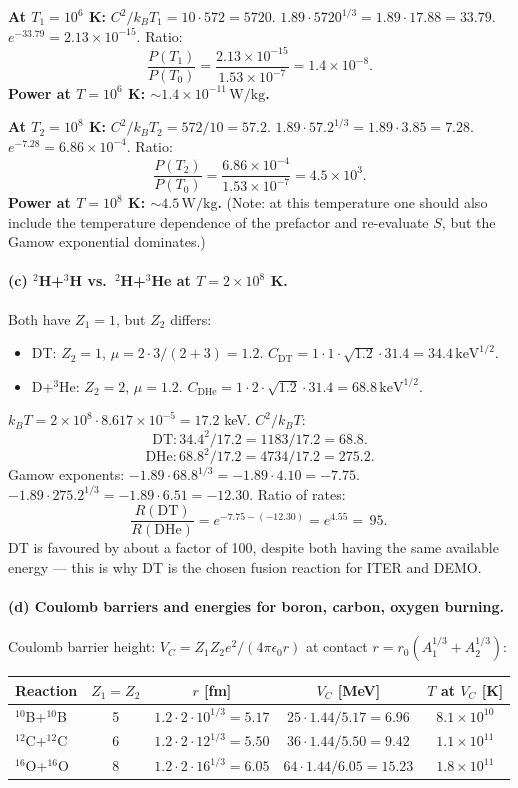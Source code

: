 \documentclass[11pt]{article}
\begin{document}
\textbf{At $T_1=10^{6}$ K:} $C^{2}/k_B T_1=10\cdot 572=5720$. $1.89\cdot 5720^{1/3}=1.89\cdot 17.88=33.79$. $e^{-33.79}=2.13\times 10^{-15}$. Ratio:
\[
\frac{P(T_1)}{P(T_0)}=\frac{2.13\times 10^{-15}}{1.53\times 10^{-7}}=1.4\times 10^{-8}.
\]
\textbf{Power at $T=10^{6}$ K: $\sim 1.4\times 10^{-11}\,\mathrm{W/kg}$.}

\textbf{At $T_2=10^{8}$ K:} $C^{2}/k_B T_2=572/10=57.2$. $1.89\cdot 57.2^{1/3}=1.89\cdot 3.85=7.28$. $e^{-7.28}=6.86\times 10^{-4}$. Ratio:
\[
\frac{P(T_2)}{P(T_0)}=\frac{6.86\times 10^{-4}}{1.53\times 10^{-7}}=4.5\times 10^{3}.
\]
\textbf{Power at $T=10^{8}$ K: $\sim 4.5\,\mathrm{W/kg}$.} (Note: at this temperature one should also include the temperature dependence of the prefactor and re-evaluate $S$, but the Gamow exponential dominates.)

\paragraph{(c) $^{2}$H+$^{3}$H vs.\ $^{2}$H+$^{3}$He at $T=2\times 10^{8}$ K.}
Both have $Z_1=1$, but $Z_2$ differs:
\begin{itemize}[itemsep=0pt]
\item DT: $Z_2=1$, $\mu=2\cdot 3/(2+3)=1.2$. $C_\mathrm{DT}=1\cdot 1\cdot\sqrt{1.2}\cdot 31.4=34.4\,\mathrm{keV}^{1/2}$.
\item D+$^{3}$He: $Z_2=2$, $\mu=1.2$. $C_\mathrm{DHe}=1\cdot 2\cdot\sqrt{1.2}\cdot 31.4=68.8\,\mathrm{keV}^{1/2}$.
\end{itemize}
$k_B T=2\times 10^{8}\cdot 8.617\times 10^{-5}=17.2$ keV. $C^{2}/k_B T$:
\[
\mathrm{DT}: 34.4^{2}/17.2=1183/17.2=68.8.
\]
\[
\mathrm{DHe}: 68.8^{2}/17.2=4734/17.2=275.2.
\]
Gamow exponents: $-1.89\cdot 68.8^{1/3}=-1.89\cdot 4.10=-7.75$. $-1.89\cdot 275.2^{1/3}=-1.89\cdot 6.51=-12.30$. Ratio of rates:
\[
\frac{R(\mathrm{DT})}{R(\mathrm{DHe})}=e^{-7.75-(-12.30)}=e^{4.55}=\boxed{\,95.\,}
\]
DT is favoured by about a factor of 100, despite both having the same available energy --- this is why DT is the chosen fusion reaction for ITER and DEMO.

\paragraph{(d) Coulomb barriers and energies for boron, carbon, oxygen burning.}

Coulomb barrier height: $V_C=Z_1 Z_2 e^{2}/(4\pi\epsilon_{0}r)$ at contact $r=r_0(A_1^{1/3}+A_2^{1/3})$:
\begin{center}
\begin{tabular}{@{}lcccc@{}}\hline
Reaction & $Z_1=Z_2$ & $r$ [fm] & $V_C$ [MeV] & $T$ at $V_C$ [K]\\\hline
$^{10}$B+$^{10}$B & 5 & $1.2\cdot 2\cdot 10^{1/3}=5.17$ & $25\cdot 1.44/5.17=6.96$ & $8.1\times 10^{10}$\\
$^{12}$C+$^{12}$C & 6 & $1.2\cdot 2\cdot 12^{1/3}=5.50$ & $36\cdot 1.44/5.50=9.42$ & $1.1\times 10^{11}$\\
$^{16}$O+$^{16}$O & 8 & $1.2\cdot 2\cdot 16^{1/3}=6.05$ & $64\cdot 1.44/6.05=15.23$ & $1.8\times 10^{11}$\\\hline
\end{tabular}
\end{center}
\end{document}
